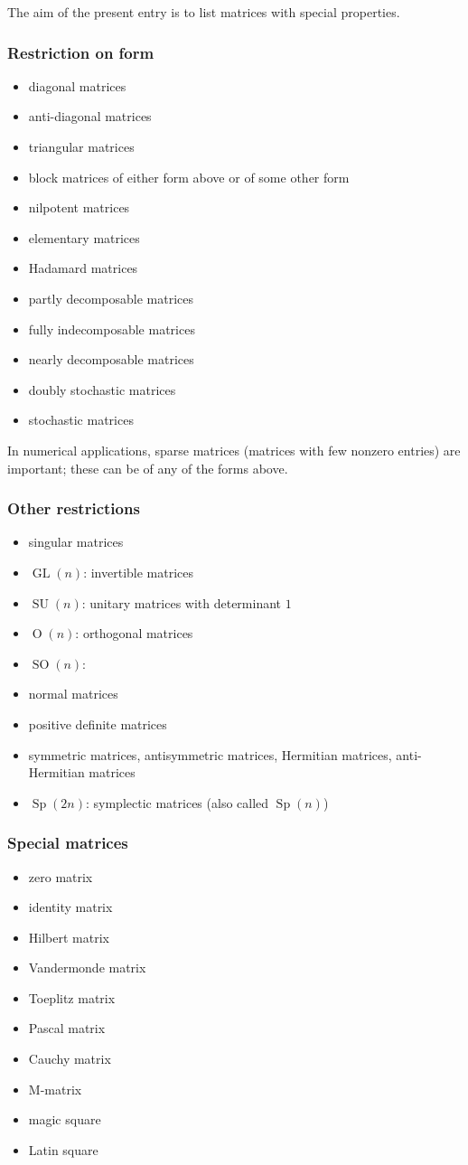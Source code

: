 \documentclass[12pt]{article}
\begin{document}
The aim of the present entry is to list matrices with special properties.

\subsubsection*{Restriction on form}
\begin{itemize}
\item diagonal matrices
\item anti-diagonal matrices
\item triangular matrices
\item block matrices of either form above or of some other form
\item nilpotent matrices
\item elementary matrices
\item Hadamard matrices
\item partly decomposable matrices
\item fully indecomposable matrices
\item nearly decomposable matrices
\item doubly stochastic matrices
\item stochastic matrices
\end{itemize}

In numerical applications, sparse matrices (matrices with few nonzero entries) are important; these can be of any of the forms above.

\subsubsection*{Other restrictions}
\begin{itemize}
\item singular matrices
\item $\operatorname{GL}(n)$: invertible matrices
\item $\operatorname{SU}(n)$: unitary matrices with determinant $1$
\item $\operatorname{O}(n)$: orthogonal matrices
\item $\operatorname{SO}(n)$: 
\item normal matrices
\item positive definite matrices
\item symmetric matrices, antisymmetric matrices, Hermitian matrices, anti-Hermitian matrices
\item $\operatorname{Sp}(2n)$: symplectic matrices (also called $\operatorname{Sp}(n)$)
\end{itemize}


\subsubsection*{Special matrices}
\begin{itemize}
\item zero matrix
\item identity matrix
\item Hilbert matrix
\item Vandermonde matrix
\item Toeplitz matrix
\item Pascal matrix
\item Cauchy matrix
\item M-matrix
\item magic square
\item Latin square
\end{itemize}
\end{document}
